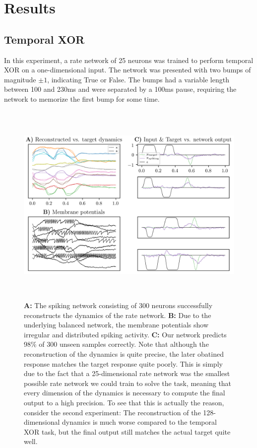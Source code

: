 \documentclass[twoside,11pt,titlepage]{article}
\begin{document}
\section{Results}

\subsection{Temporal XOR}
In this experiment, a rate network of 25 neurons was trained to perform
temporal XOR on a one-dimensional input. The network was presented with two bumps
of magnitude $\pm 1$, indicating True or False. The bumps had a variable length
between 100 and 230ms and were separated by a 100ms pause, requiring the network
to memorize the first bump for some time. 

\begin{figure}[!htb]
  \includegraphics[width = \columnwidth, height=10cm]{figures/figure2.png}
  \caption{\textbf{A:} The spiking network consisting
  of 300 neurons successfully reconstructs the dynamics of the rate network.
  \textbf{B:} Due to the underlying balanced network, the membrane potentials show
  irregular and distributed spiking activity.
  \textbf{C:} Our network predicts 98\% of 300 unseen samples correctly. Note that although the
  reconstruction of the dynamics is quite precise, the later obatined response matches
  the target response quite poorly. This is simply due to the fact that a 25-dimensional
  rate network was the smallest possible rate network we could train to solve the task, meaning
  that every dimension of the dynamics is necessary to compute the final output to a high
  precision. To see that this is actually the reason, consider the second experiment:
  The reconstruction of the 128-dimensional dynamics is much worse compared to the temporal
  XOR task, but the final output still matches the actual target quite well.}
  \label{fig:figure2}
\end{figure}
\end{document}
